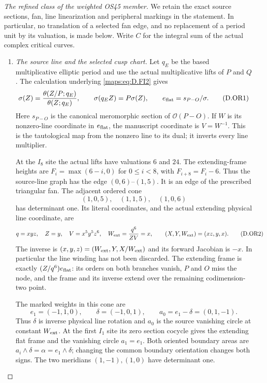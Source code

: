 \begin{proof}[The refined class of the weighted OS45 member]
\label{maps:proof:D.OS.refined}
We retain the exact source sections, fan, line linearization and peripheral
markings in the statement.  In particular, no translation of a selected fan
edge, and no replacement of a period unit by its valuation, is made below.
Write $C$ for the integral sum of the actual complex critical curves.
\begin{enumerate}
\item \emph{The source line and the selected cusp chart.}
Let $q_E$ be the based multiplicative elliptic period and use the actual
multiplicative lifts of $P$ and $Q$.  The calculation underlying
\eqref{maps:eq:D.FI2} gives
\[
 \sigma(Z)=\frac{\theta(Z/P;q_E)}{\theta(Z;q_E)},\qquad
 \sigma(q_E Z)=P\sigma(Z),\qquad e_{\rm flat}=s_{P-O}/\sigma .
 \tag{D.OR1}\label{maps:eq:D.OR1}
\]
Here $s_{P-O}$ is the canonical meromorphic section of
$\mathcal O(P-O)$.  If $W$ is its nonzero-line coordinate in $e_{\rm flat}$,
the manuscript coordinate is $V=W^{-1}$.  This is the tautological map from
the nonzero line to its dual; it inverts every line multiplier.

At the $I_8$ site the actual lifts have valuations $6$ and $24$.
The extending-frame heights are $F_i=\max(6-i,0)$ for $0\leq i<8$,
with $F_{i+8}=F_i-6$.  Thus the source-line graph has the edge
$(0,6)$--$(1,5)$.  It is an edge of the prescribed triangular fan.
The adjacent ordered cone
\[
 (1,0,5),\quad(1,1,5),\quad(1,0,6)
\]
has determinant one.  Its literal coordinates, and the actual extending
physical line coordinate, are
\[
 q=xyz,\quad Z=y,\quad V=x^5y^5z^6,\quad
 W_{\rm ext}=\frac{q^6}{ZV}=x,\qquad
 (X,Y,W_{\rm ext})=(xz,y,x).
 \tag{D.OR2}\label{maps:eq:D.OR2}
\]
The inverse is $(x,y,z)=(W_{\rm ext},Y,X/W_{\rm ext})$ and its forward
Jacobian is $-x$.  In particular the line winding has not been discarded.
The extending frame is exactly $(Z/q^6)e_{\rm flat}$: its orders on both
branches vanish, $P$ and $O$ miss the node, and the frame and its inverse
extend over the remaining codimension-two point.

The marked weights in this cone are
\[
 e_1=(-1,1,0),\qquad \delta=(-1,0,1),\qquad
 a_0=e_1-\delta=(0,1,-1).
 \tag{D.OR3}\label{maps:eq:D.OR3}
\]
Thus $\delta$ is inverse physical line rotation and $a_0$ is the source
vanishing circle at constant $W_{\rm ext}$.  At the first $I_1$ site its
zero section cocycle gives the extending flat frame and the vanishing
circle $a_1=e_1$.  Both oriented boundary areas are
$a_i\wedge\delta=\alpha=e_1\wedge\delta$; changing the common boundary
orientation changes both signs.  The two meridians $(1,-1),(1,0)$ have
determinant one.


\end{enumerate}
\end{proof}
